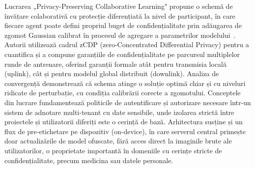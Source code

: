 Lucrarea „Privacy-Preserving Collaborative Learning" propune o schemă de învățare colaborativă cu protecție diferențiată la nivel de participant, în care fiecare agent poate defini propriul buget de confidențialitate prin adăugarea de zgomot Gaussian calibrat în procesul de agregare a parametrilor modelului~\cite{10163938}. Autorii utilizează cadrul zCDP (zero-Concentrated Differential Privacy) pentru a cuantifica și a compune garanțiile de confidențialitate pe parcursul multiplelor runde de antrenare, oferind garanții formale atât pentru transmisia locală (uplink), cât și pentru modelul global distribuit (downlink). Analiza de convergență demonstrează că schema atinge o soluție optimă chiar și cu niveluri ridicate de perturbație, cu condiția calibrării corecte a zgomotului. Conceptele din lucrare fundamentează politicile de autentificare și autorizare necesare într-un sistem de adnotare multi-tenant cu date sensibile, unde izolarea strictă între proiectele și utilizatorii diferiți este o cerință de bază. Arhitectura susține și un flux de pre-etichetare pe dispozitiv (on-device), în care serverul central primește doar actualizările de model ofuscate, fără acces direct la imaginile brute ale utilizatorilor, o proprietate importantă în domeniile cu cerințe stricte de confidențialitate, precum medicina sau datele personale.
